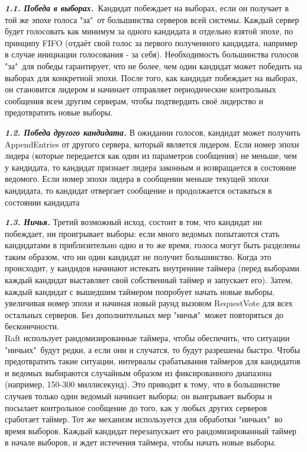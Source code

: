\documentclass[subf, href, colorlinks=true, 14pt,
times, mtpro, specialist]{disser}
\theoremstyle{definition}
\begin{document}
\textbf{\textit{1.1. Победа в выборах.}}\
Кандидат побеждает на выборах, если он получает в той же эпохе голоса "за"\ от большинства серверов всей системы. Каждый сервер будет голосовать как минимум за одного кандидата в отдельно взятой эпохе, по принципу FIFO (отдаёт свой голос за первого полученного кандидата, например в случае инициации голосования - за себя). Необходимость большинства голосов "за"\ для победы гарантирует, что не более, чем один кандидат может победить на выборах для конкретной эпохи. После того, как кандидат побеждает на выборах, он становится лидером и начинает отправляет периодические контрольных сообщения всем другим серверам, чтобы подтвердить своё лидерство и предотвратить новые выборы.

\textbf{\textit{1.2. Победа другого кандидата.}}
В ожидании голосов, кандидат может получить AppendEntries от другого сервера, который является лидером. Если номер эпохи лидера (которые передается как один из параметров сообщения) не меньше, чем у кандидата, то кандидат признает лидера законным и возвращается в состояние ведомого. Если номер эпохи лидера в сообщении меньше текущей эпохи кандидата, то кандидат отвергает сообщение и продолжается оставаться в состоянии кандидата

\textbf{\textit{1.3. Ничья.}}
Третий возможный исход, состоит в том, что кандидат ни побеждает, ни проигрывает выборы: если много ведомых попытаются стать кандидатами в приблизительно одно и то же время, голоса могут быть разделены таким образом, что ни один кандидат не получит большинство. Когда это происходит, у кандидов начинают истекать внутренние таймера (перед выборами каждый кандидат выставляет свой собственный таймер и запускает его). Затем, каждый кандидат с вышедшим таймером попробует начать новые выборы, увеличивая номер эпохи и начиная новый раунд вызовом RequestVote для всех остальных серверов. Без дополнительных мер "ничья"\ может повторяться до бесконечности. \\


Raft использует рандомизированные таймера, чтобы обеспечить, что ситуации "ничьих"\ будут редки, а если они и случатся, то будут разрешены быстро. Чтобы предотвратить такие ситуации, интервалы срабатывания таймеров для кандидатов и ведомых выбираются случайным образом из фиксированного диапазона (например, 150-300 миллисекунд). Это приводит к тому, что в большинстве случаев только один ведомый начинает выборы; он выигрывает выборы и посылает контрольное сообщение до того, как у любых других серверов сработает таймер. Тот же механизм используется для обработки "ничьих"\ во время выборов. Каждый кандидат перезапускает его рандомизированный таймер в начале выборов, и ждет истечения таймера, чтобы начать новые выборы. \\
\end{document}
